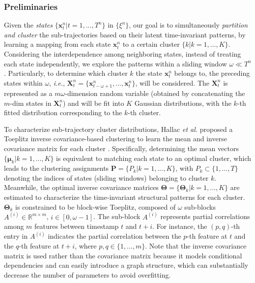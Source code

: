 \documentclass{article}
\begin{document}
\subsubsection{Preliminaries} 

Given the \emph{states}  $\{\mathbf{x}_{t}^{n}|t=1, ..., T^{n}\}$ in $\{\xi^{n}\}$, our goal is to simultaneously \emph{partition and cluster} the sub-trajectories based on their latent time-invariant patterns, by learning a mapping from each state $\mathbf{x}_t^n$ to a certain cluster $\{k|k=1, ...,K\}$. 
Considering the interdependence among neighboring states, instead of treating each state independently, we explore the patterns within a sliding window $\omega \ll T^n$. Particularly, to determine which cluster $k$ the state $\mathbf{x}_t^n$ belongs to, the preceding states within $\omega$, \textit{i.e.}, $\mathbf{X}_t^n=\{\mathbf{x}_{t-\omega+1}^{n}, ...,\mathbf{x}_{t}^{n}\}$, will be considered. 
The $\mathbf{X}_t^n$ is represented as a $m\omega$-dimension random variable (obtained by concatenating the $m$-dim states in $\mathbf{X}_t^n$) and will be fit into $K$ Gaussian distributions, with the $k$-th fitted distribution corresponding to the $k$-th cluster. 


To characterize sub-trajectory cluster distributions, Hallac \textit{et al.} proposed a Toeplitz inverse covariance-based clustering to learn the mean and inverse covariance matrix for each cluster \cite{hallac2017toeplitz}.  
Specifically, determining the mean vectors $\{\mathbf{\mu}_{k}| k=1,...,K\}$ is equivalent to matching each state to an optimal cluster, which leads to the clustering assignments $\mathbf{P}=\{P_k | k=1,...,K\}$, with $P_k \subset \{1, ..., T\}$ denoting the indices of states (sliding windows) belonging to cluster $k$. Meanwhile, the optimal inverse covariance matrices $\mathbf{\Theta} = \{\mathbf{\Theta}_k | k=1, ..., K\}$ are estimated to characterize the time-invariant structural patterns for each cluster. $\mathbf{\Theta}_{k}$ is constrained to be block-wise Toeplitz, composed of $\omega$ sub-blocks $A^{(i)}\in \mathbb{R}^{m\times m}$, $ i \in [0, \omega-1]$. The sub-block $A^{(i)}$ represents partial correlations among $m$ features between timestamp $t$ and $t+i$. For instance, the $(p,q)$-th entry in $A^{(i)}$ indicates the partial correlation between the $p$-th feature at $t$ and the $q$-th feature at $t+i$, where $p,q \in \{ 1, ..., m \}$. Note that the inverse covariance matrix is used rather than the covariance matrix because it models conditional dependencies and can easily introduce a graph structure, which can substantially decrease the number of parameters to avoid overfitting.
\end{document}
